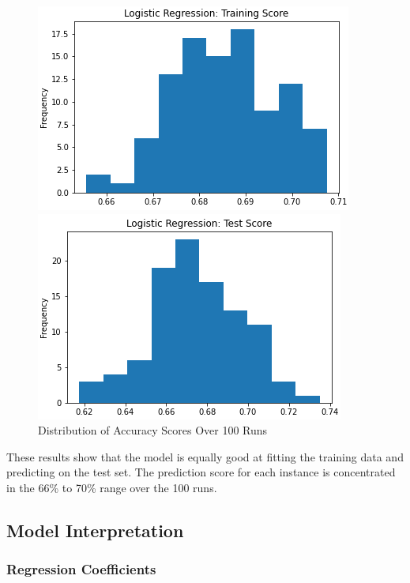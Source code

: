 \documentclass{article}
\begin{document}
\begin{figure}[htb]
\begin{minipage}[b]{.48\linewidth}
  \centering
  \centerline{\includegraphics[scale=0.3]{Log_Reg_Train_Score.png}}
\end{minipage}
\hfill
\begin{minipage}[b]{0.48\linewidth}
  \centering
  \centerline{\includegraphics[scale=0.3]{Log_Reg_Test_Score.png}}
\end{minipage}
\caption{Distribution of Accuracy Scores Over 100 Runs}
\label{fig:res}
\end{figure}

These results show that the model is equally good at fitting the training data and predicting on the test set. The prediction score for each instance is concentrated in the 66\% to 70\% range over the 100 runs.

\subsection{Model Interpretation}
\label{ssec:subhead}

\subsubsection{Regression Coefficients}
\label{sssec:subsubhead}
\end{document}
